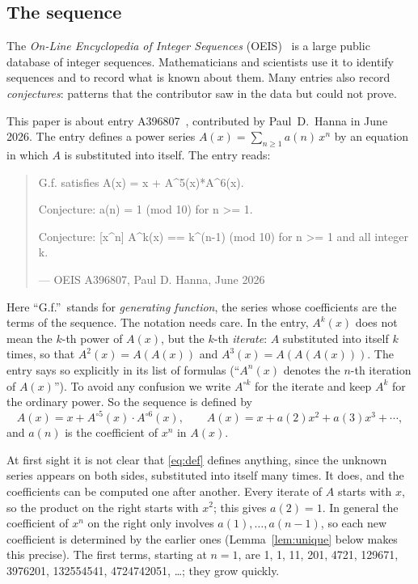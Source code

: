 \documentclass[11pt,a4paper]{article}
\theoremstyle{definition}
\theoremstyle{remark}
\begin{document}
\subsection{The sequence}\label{sec:sequence}
The \emph{On-Line Encyclopedia of Integer Sequences} (OEIS)~\cite{oeisdb} is a large public database of integer
sequences. Mathematicians and scientists use it to identify sequences and to record what is known about them. Many
entries also record \emph{conjectures}: patterns that the contributor saw in the data but could not prove.

This paper is about entry A396807~\cite{oeis}, contributed by Paul~D.~Hanna in June 2026.
The entry defines a power series $A(x)=\sum_{n\ge1}a(n)\,x^n$ by an equation in which $A$ is substituted into
itself. The entry reads:
\begin{quote}\small\ttfamily\raggedright G.f. satisfies A(x) = x + A\^{}5(x)*A\^{}6(x).\par\smallskip Conjecture: a(n) = 1 (mod 10) for n >= 1.\par\smallskip Conjecture: [x\^{}n] A\^{}k(x) == k\^{}(n-1) (mod 10) for n >= 1 and all integer k.\par\smallskip\hfill\textrm{--- OEIS A396807, Paul D. Hanna, June 2026}\end{quote}

Here ``G.f.''\ stands for \emph{generating function}, the series whose coefficients are the terms of the sequence.
The notation needs care. In the entry, $A^k(x)$ does not mean the $k$-th power of $A(x)$, but the $k$-th
\emph{iterate}: $A$ substituted into itself $k$ times, so that $A^2(x)=A(A(x))$ and $A^3(x)=A(A(A(x)))$. The entry
says so explicitly in its list of formulas (``$A^n(x)$ denotes the $n$-th iteration of $A(x)$''). To avoid any
confusion we write $A^{\circ k}$ for the iterate and keep $A^k$ for the ordinary power. So the sequence is defined by
\begin{equation}\label{eq:def}
A(x)=x+A^{\circ5}(x)\cdot A^{\circ6}(x),\qquad A(x)=x+a(2)x^2+a(3)x^3+\cdots,
\end{equation}
and $a(n)$ is the coefficient of $x^n$ in $A(x)$.

At first sight it is not clear that \eqref{eq:def} defines anything, since the unknown series appears on both sides,
substituted into itself many times. It does, and the coefficients can be computed one after another. Every iterate
of $A$ starts with $x$, so the product on the right starts with $x^2$; this gives $a(2)=1$. In general the
coefficient of $x^n$ on the right only involves $a(1),\dots,a(n-1)$, so each new coefficient is determined by the
earlier ones (Lemma~\ref{lem:unique} below makes this precise). The first terms, starting at $n=1$, are
1, 1, 11, 201, 4721, 129671, 3976201, 132554541, 4724742051, \dots; they grow quickly.
\end{document}
